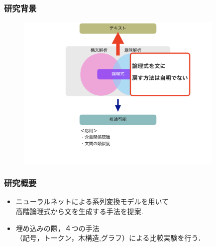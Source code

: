 \documentclass[dvipdfmx,cjk]{beamer}
\begin{document}
\begin{frame}
\frametitle{研究背景}
\begin{center}
\begin{figure}[h]
	\includegraphics[width=10cm]{backend2.png}
        \label{fig:backend2}
\end{figure}
\end{center}
\end{frame}



\begin{frame}
\frametitle{研究概要}
\begin{center}
\end{center}
\begin{block}{}
  \begin{itemize}
    \item ニューラルネットによる系列変換モデルを用いて\\高階論理式から文を生成する手法を提案.
    \item 埋め込みの際，４つの手法\\（記号，トークン，木構造,グラフ）による比較実験を行う．
  \end{itemize}
\end{block}

\end{frame}
\end{document}
